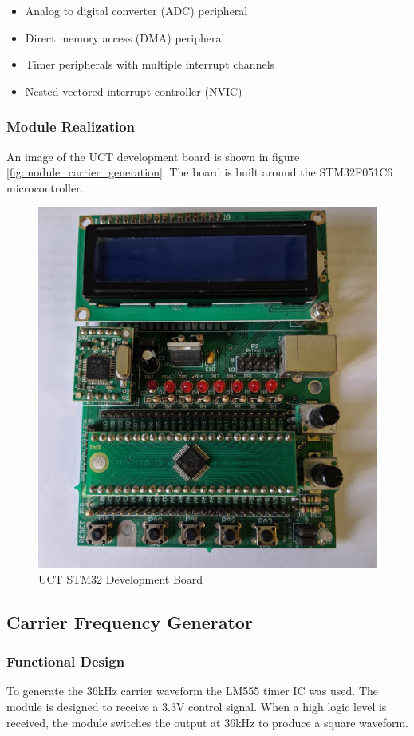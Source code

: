 \begin{itemize}
	\item Analog to digital converter (ADC) peripheral
	\item Direct memory access (DMA) peripheral
	\item Timer peripherals with multiple interrupt channels
	\item Nested vectored interrupt controller (NVIC)
\end{itemize}


\subsubsection{Module Realization}
An image of the UCT development board is shown in figure \ref{fig:module_carrier_generation}. The board is built around the STM32F051C6 microcontroller.

\begin{figure}[H]
	\centering
	\includegraphics[width=.5\textwidth]{figures/design/dev_board_image.jpg}
	\caption{UCT STM32 Development Board}
	\label{fig:stm32_dev_board}
\end{figure}






\subsection{Carrier Frequency Generator}
\subsubsection{Functional Design}
To generate the 36kHz carrier waveform the LM555 timer IC was used. The module is designed to receive a 3.3V control signal. When a high logic level is received, the module switches the output at 36kHz to produce a square waveform.

